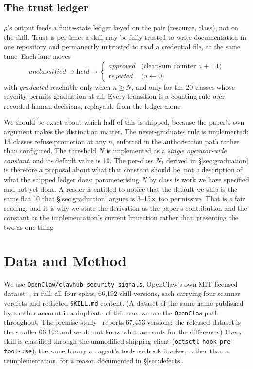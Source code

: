 \documentclass[10pt]{article}
\begin{document}
\subsection{The trust ledger}

$\rho$'s output feeds a finite-state ledger keyed on the pair (resource, class),
not on the skill. Trust is per-lane: a skill may be fully trusted to write
documentation in one repository and permanently untrusted to read a credential file,
at the same time. Each lane moves
\[
\textit{unclassified} \rightarrow \textit{held} \rightarrow
\begin{cases}
\textit{approved} & \text{(clean-run counter } n \mathbin{+}\mathbin{=} 1)\\
\textit{rejected} & \text{(} n \leftarrow 0 \text{)}
\end{cases}
\]
with \textit{graduated} reachable only when $n \geq N$, and only for the 20 classes
whose severity permits graduation at all. Every transition is a counting rule over
recorded human decisions, replayable from the ledger alone.

We should be exact about which half of this is shipped, because the paper's own
argument makes the distinction matter. The never-graduates rule is implemented: 13
classes refuse promotion at any $n$, enforced in the authorisation path rather than
configured. The threshold $N$ is implemented as a \emph{single operator-wide
constant}, and its default value is 10. The per-class $N_k$ derived in
\S\ref{sec:graduation} is therefore a proposal about what that constant should be,
not a description of what the shipped ledger does; parameterising $N$ by class is
work we have specified and not yet done. A reader is entitled to notice that the
default we ship is the same flat 10 that \S\ref{sec:graduation} argues is
3--15$\times$ too permissive. That is a fair reading, and it is why we state the
derivation as the paper's contribution and the constant as the implementation's
current limitation rather than presenting the two as one thing.

\section{Data and Method}
\label{sec:method}

We use \texttt{OpenClaw/clawhub-security-signals}, OpenClaw's own MIT-licensed
dataset~\cite{clawhubdataset}, in full: all four splits, 66,192 skill versions, each
carrying four scanner verdicts and redacted \texttt{SKILL.md} content. (A dataset of
the same name published by another account is a duplicate of this one; we use the
\texttt{OpenClaw} path throughout. The premise study~\cite{clawhubsignals} reports
67,453 versions; the released dataset is the smaller 66,192 and we do not know what
accounts for the difference.) Every skill is classified through the unmodified
shipping client (\texttt{oatsctl hook pre-tool-use}), the same binary an agent's
tool-use hook invokes, rather than a reimplementation, for a reason documented in
\S\ref{sec:defects}.
\end{document}
